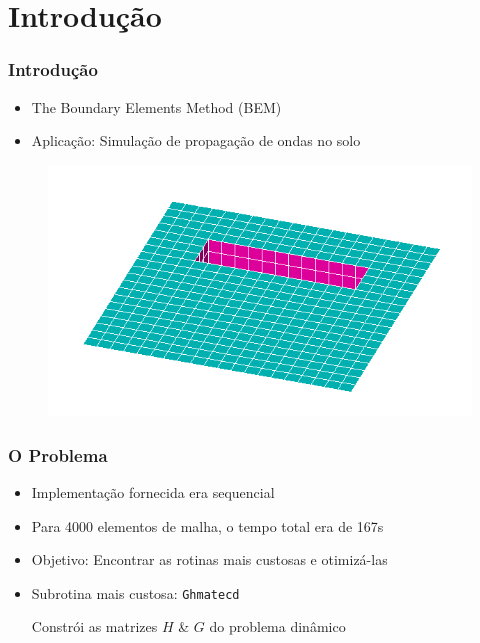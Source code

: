 \documentclass{beamer}
\begin{document}
%

\section{Introdução}
\begin{frame}
\frametitle{Introdução}
\begin{itemize}
\item The Boundary Elements Method (BEM)
\item Aplicação: Simulação de propagação de ondas no solo
\end{itemize}
\begin{figure}
	\includegraphics[scale=0.5]{trincheira.png}
\end{figure}
\end{frame}


\begin{frame}
\frametitle{O Problema}
\begin{itemize}
\item Implementação fornecida era sequencial
\item Para 4000 elementos de malha, o tempo total era de 167s
\item Objetivo: Encontrar as rotinas mais custosas e otimizá-las
\item Subrotina mais custosa: \texttt{Ghmatecd}
\begin{itemize}
 Constrói as matrizes $H$ \& $G$ do problema dinâmico
\end{itemize}
\end{itemize}
\end{frame}

\end{document}
